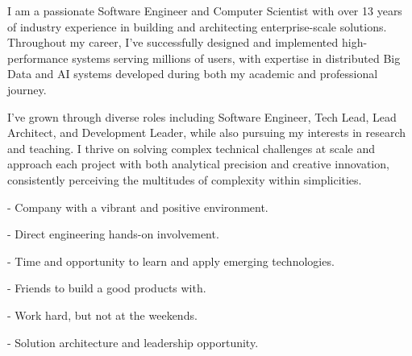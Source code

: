 \documentclass[10pt,a4paper,ragged2e,withhyper]{altacv}
\begin{document}



\begin{raggedright}
  I am a passionate Software Engineer and Computer Scientist with over 13 years of industry experience 
  in building and architecting enterprise-scale solutions. Throughout my career, I've successfully 
  designed and implemented high-performance systems serving millions of users, with expertise in 
  distributed Big Data and AI systems developed during both my academic and professional journey.  
  
  \vspace{0.5cm}
  I've grown through diverse roles including Software Engineer, Tech Lead, Lead Architect, 
  and Development Leader, while also pursuing my interests in research and teaching. I thrive on 
  solving complex technical challenges at scale and approach each project with both analytical 
  precision and creative innovation, consistently perceiving the multitudes of complexity within 
  simplicities.
\end{raggedright}

\vspace{0.4cm}


\begin{raggedright}

- Company with a vibrant and positive environment.

- Direct engineering hands-on involvement.

- Time and opportunity to learn and apply emerging technologies.

- Friends to build a good products with.

- Work hard, but not at the weekends.

- Solution architecture and leadership opportunity.

\end{raggedright}


\end{document}
